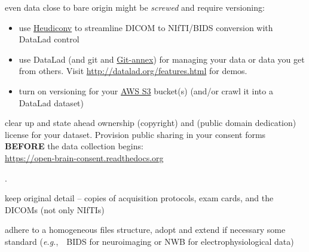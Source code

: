 \documentclass[letterpaper,landscape]{report}
\newcommand{\eg}[0]{\emph{e.g.},\ }
\begin{document}
\begin{multicols}{3}
\begin{description}[nolistsep,leftmargin=1pc,style=nextline]
\item[Version your data:] even data close to bare origin might be
  \emph{screwed} and require versioning:
  \begin{itemize}[nolistsep,leftmargin=1pc,style=nextline]
   \item use \href{https://github.com/nipy/heudiconv}{Heudiconv}
     to streamline DICOM to NIfTI/BIDS conversion with DataLad
     control
  \item use DataLad (and git and
    \href{http://git-annex.branchable.com}{Git-annex})
    for managing your data or data you get from others.
    Visit \url{http://datalad.org/features.html} for demos.
  \item turn on versioning for your \href{http://aws.amazon.com/s3}{AWS S3}
    bucket(s) (and/or crawl it into a DataLad dataset)
  \end{itemize}

\item[Stay legit:] clear up and state ahead ownership (copyright) and
  (public domain dedication) license for your dataset. Provision
  public sharing in your consent forms\\ \textbf{BEFORE} the data
  collection begins:\\ \url{https://open-brain-consent.readthedocs.org}

\end{description}
\vspace{27em}

{\tiny \color{white}.}
\columnbreak

\begin{description}[nolistsep,leftmargin=1pc,style=nextline]

\item[Keep detail:] keep original detail -- copies of acquisition
  protocols, exam cards, and the DICOMs (not only NIfTIs)

\item[Be comprehensible:] adhere to a homogeneous files structure,
  adopt and extend if necessary some standard
  (\eg\ BIDS for neuroimaging or NWB for electrophysiological data)


\end{description}
\end{multicols}
\end{document}
